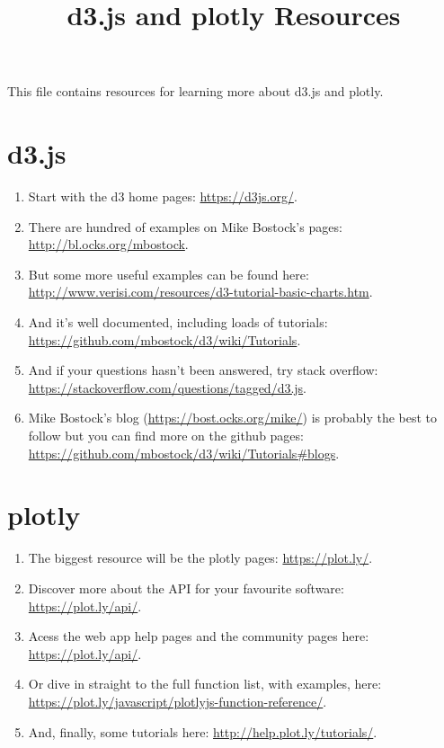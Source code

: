 \documentclass[a4paper]{article}
\title{d3.js and plotly Resources}
\begin{document}
    \maketitle
    This file contains resources for learning more about d3.js and plotly.\\

    \section{d3.js}
    \begin{enumerate}
        \item Start with the d3 home pages: \url{https://d3js.org/}.\\
        \item There are hundred of examples on Mike Bostock's pages: \url{http://bl.ocks.org/mbostock}.\\
        \item But some more useful examples can be found here: \url{http://www.verisi.com/resources/d3-tutorial-basic-charts.htm}.\\
        \item And it's well documented, including loads of tutorials: \url{https://github.com/mbostock/d3/wiki/Tutorials}.\\
        \item And if your questions hasn't been answered, try stack overflow: \url{https://stackoverflow.com/questions/tagged/d3.js}.\\
        \item Mike Bostock's blog (\url{https://bost.ocks.org/mike/}) is probably the best to follow but you can find more on the github pages: \url{https://github.com/mbostock/d3/wiki/Tutorials#blogs}.\\
    \end{enumerate}

    \section{plotly}
    \begin{enumerate}
        \item The biggest resource will be the plotly pages: \url{https://plot.ly/}.\\
        \item Discover more about the API for your favourite software: \url{https://plot.ly/api/}.\\
        \item Acess the web app help pages and the community pages here: \url{https://plot.ly/api/}.\\
        \item Or dive in straight to the full function list, with examples, here: \url{https://plot.ly/javascript/plotlyjs-function-reference/}.\\
        \item And, finally, some tutorials here: \url{http://help.plot.ly/tutorials/}.\\
    \end{enumerate}
\end{document}

